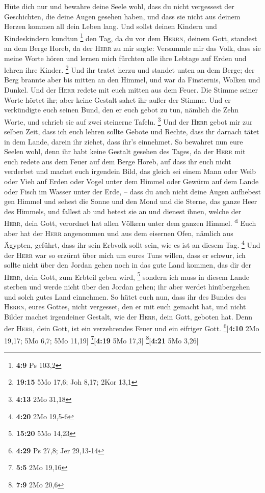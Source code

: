  Hüte dich nur und bewahre deine Seele wohl, dass du nicht
vergessest der Geschichten, die deine Augen gesehen haben, und dass sie
nicht aus deinem Herzen kommen all dein Leben lang. Und sollst deinen
Kindern und Kindeskindern kundtun \footnote{\textbf{4:9} Ps 103,2}
 den Tag, da du vor dem \textsc{Herrn}, deinem Gott,
standest an dem Berge Horeb, da der \textsc{Herr} zu mir sagte:
Versammle mir das Volk, dass sie meine Worte hören und lernen mich
fürchten alle ihre Lebtage auf Erden und lehren ihre Kinder. \footnote{\textbf{19:15}
  5Mo 17,6; Joh 8,17; 2Kor 13,1}  Und ihr tratet herzu
und standet unten an dem Berge; der Berg brannte aber bis mitten an den
Himmel, und war da Finsternis, Wolken und Dunkel.  Und
der \textsc{Herr} redete mit euch mitten aus dem Feuer. Die Stimme
seiner Worte hörtet ihr; aber keine Gestalt sahet ihr außer der Stimme.
 Und er verkündigte euch seinen Bund, den er euch gebot
zu tun, nämlich die Zehn Worte, und schrieb sie auf zwei steinerne
Tafeln. \footnote{\textbf{4:13} 2Mo 31,18}  Und der
\textsc{Herr} gebot mir zur selben Zeit, dass ich euch lehren sollte
Gebote und Rechte, dass ihr darnach tätet in dem Lande, darein ihr
ziehet, dass ihr's einnehmet.  So bewahret nun eure
Seelen wohl, denn ihr habt keine Gestalt gesehen des Tages, da der
\textsc{Herr} mit euch redete aus dem Feuer auf dem Berge Horeb,
 auf dass ihr euch nicht verderbet und machet euch
irgendein Bild, das gleich sei einem Mann oder Weib  oder
Vieh auf Erden oder Vogel unter dem Himmel  oder Gewürm
auf dem Lande oder Fisch im Wasser unter der Erde, -- 
dass du auch nicht deine Augen aufhebest gen Himmel und sehest die Sonne
und den Mond und die Sterne, das ganze Heer des Himmels, und fallest ab
und betest sie an und dienest ihnen, welche der \textsc{Herr}, dein
Gott, verordnet hat allen Völkern unter dem ganzen Himmel.
\textsuperscript{d}  Euch aber hat der \textsc{Herr}
angenommen und aus dem eisernen Ofen, nämlich aus Ägypten, geführt, dass
ihr sein Erbvolk sollt sein, wie es ist an diesem Tag. \footnote{\textbf{4:20}
  2Mo 19,5-6}  Und der \textsc{Herr} war so erzürnt über
mich um eures Tuns willen, dass er schwur, ich sollte nicht über den
Jordan gehen noch in das gute Land kommen, das dir der \textsc{Herr},
dein Gott, zum Erbteil geben wird, \footnote{\textbf{15:20} 5Mo 14,23}
 sondern ich muss in diesem Lande sterben und werde nicht
über den Jordan gehen; ihr aber werdet hinübergehen und solch gutes Land
einnehmen.  So hütet euch nun, dass ihr des Bundes des
\textsc{Herrn}, eures Gottes, nicht vergesset, den er mit euch gemacht
hat, und nicht Bilder machet irgendeiner Gestalt, wie der \textsc{Herr},
dein Gott, geboten hat.  Denn der \textsc{Herr}, dein
Gott, ist ein verzehrendes Feuer und ein eifriger Gott.
\footnote{\textbf{4:29} Ps 27,8; Jer 29,13-14}{[}\textbf{4:10} 2Mo
19,17; 5Mo 6,7; 5Mo 11,19{]} \footnote{\textbf{5:5} 2Mo 19,16}{[}\textbf{4:19}
5Mo 17,3{]} \footnote{\textbf{7:9} 2Mo 20,6}{[}\textbf{4:21} 5Mo 3,26{]}

